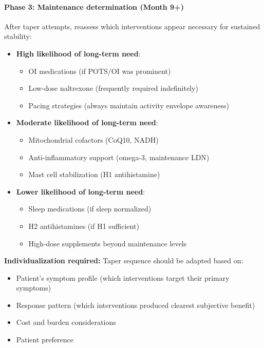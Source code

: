 \begin{protocol}
\paragraph{Phase 3: Maintenance determination (Month 9+)}

After taper attempts, reassess which interventions appear necessary for sustained stability:

\begin{itemize}
    \item \textbf{High likelihood of long-term need}:
    \begin{itemize}
        \item OI medications (if POTS/OI was prominent)
        \item Low-dose naltrexone (frequently required indefinitely)
        \item Pacing strategies (always maintain activity envelope awareness)
    \end{itemize}

    \item \textbf{Moderate likelihood of long-term need}:
    \begin{itemize}
        \item Mitochondrial cofactors (CoQ10, NADH)
        \item Anti-inflammatory support (omega-3, maintenance LDN)
        \item Mast cell stabilization (H1 antihistamine)
    \end{itemize}

    \item \textbf{Lower likelihood of long-term need}:
    \begin{itemize}
        \item Sleep medications (if sleep normalized)
        \item H2 antihistamines (if H1 sufficient)
        \item High-dose supplements beyond maintenance levels
    \end{itemize}
\end{itemize}

\textbf{Individualization required:} Taper sequence should be adapted based on:
\begin{itemize}
    \item Patient's symptom profile (which interventions target their primary symptoms)
    \item Response pattern (which interventions produced clearest subjective benefit)
    \item Cost and burden considerations
    \item Patient preference
\end{itemize}

\end{protocol}


